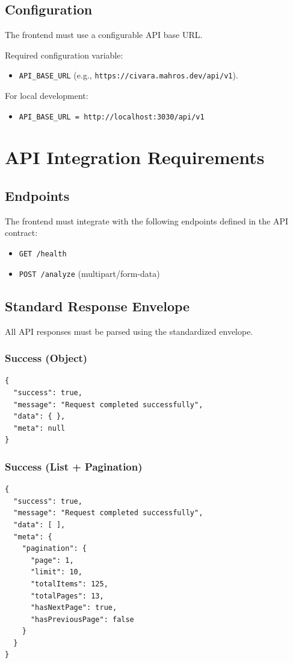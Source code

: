 \documentclass[12pt,a4paper]{article}
\begin{document}
\subsection{Configuration}

The frontend must use a configurable API base URL.

Required configuration variable:
\begin{itemize}
    \item \texttt{API\_BASE\_URL} (e.g., \texttt{https://civara.mahros.dev/api/v1}).
\end{itemize}

For local development:
\begin{itemize}
    \item \texttt{API\_BASE\_URL = http://localhost:3030/api/v1}
\end{itemize}

\section{API Integration Requirements}

\subsection{Endpoints}

The frontend must integrate with the following endpoints defined in the API contract:
\begin{itemize}
    \item \texttt{GET /health}
    \item \texttt{POST /analyze} (multipart/form-data)
\end{itemize}

\subsection{Standard Response Envelope}

All API responses must be parsed using the standardized envelope.

\subsubsection{Success (Object)}
\begin{lstlisting}
{
  "success": true,
  "message": "Request completed successfully",
  "data": { },
  "meta": null
}
\end{lstlisting}

\subsubsection{Success (List + Pagination)}
\begin{lstlisting}
{
  "success": true,
  "message": "Request completed successfully",
  "data": [ ],
  "meta": {
    "pagination": {
      "page": 1,
      "limit": 10,
      "totalItems": 125,
      "totalPages": 13,
      "hasNextPage": true,
      "hasPreviousPage": false
    }
  }
}
\end{lstlisting}
\end{document}
